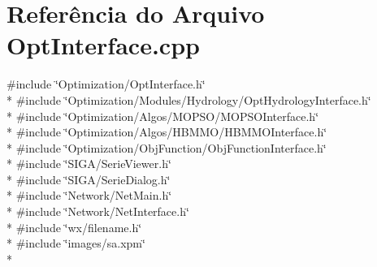 \section{Referência do Arquivo Opt\+Interface.\+cpp}
\label{_opt_interface_8cpp}
{\ttfamily \#include \char`\"{}Optimization/\+Opt\+Interface.\+h\char`\"{}}\\*
{\ttfamily \#include \char`\"{}Optimization/\+Modules/\+Hydrology/\+Opt\+Hydrology\+Interface.\+h\char`\"{}}\\*
{\ttfamily \#include \char`\"{}Optimization/\+Algos/\+M\+O\+P\+S\+O/\+M\+O\+P\+S\+O\+Interface.\+h\char`\"{}}\\*
{\ttfamily \#include \char`\"{}Optimization/\+Algos/\+H\+B\+M\+M\+O/\+H\+B\+M\+M\+O\+Interface.\+h\char`\"{}}\\*
{\ttfamily \#include \char`\"{}Optimization/\+Obj\+Function/\+Obj\+Function\+Interface.\+h\char`\"{}}\\*
{\ttfamily \#include \char`\"{}S\+I\+G\+A/\+Serie\+Viewer.\+h\char`\"{}}\\*
{\ttfamily \#include \char`\"{}S\+I\+G\+A/\+Serie\+Dialog.\+h\char`\"{}}\\*
{\ttfamily \#include \char`\"{}Network/\+Net\+Main.\+h\char`\"{}}\\*
{\ttfamily \#include \char`\"{}Network/\+Net\+Interface.\+h\char`\"{}}\\*
{\ttfamily \#include \char`\"{}wx/filename.\+h\char`\"{}}\\*
{\ttfamily \#include \char`\"{}images/sa.\+xpm\char`\"{}}\\*
